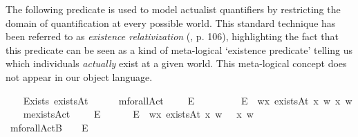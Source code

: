 \begin{isabellebody}
\isamarkuptrue%
%
\begin{isamarkuptext}%
The following predicate is used to model actualist quantifiers by restricting the domain of quantification at every possible world.
This standard technique has been referred to as \emph{existence relativization} (\cite{fitting98}, p. 106),
highlighting the fact that this predicate can be seen as a kind of meta-logical `existence predicate' telling us
which individuals \emph{actually} exist at a given world. This meta-logical concept does not appear in our object language.%
\end{isamarkuptext}\isamarkuptrue%
\ \ \isamarkupfalse%
\ Exists{\isacharcolon}{\isacharcolon}{\isachardoublequoteopen}{\isasymup}{\isasymlangle}{\isasymzero}{\isasymrangle}{\isachardoublequoteclose}\ {\isacharparenleft}{\isachardoublequoteopen}existsAt{\isachardoublequoteclose}{\isacharparenright}\ \ \isanewline
\isanewline
\ \ \isamarkupfalse%
\ mforallAct\ \ \ {\isacharcolon}{\isacharcolon}\ {\isachardoublequoteopen}{\isasymup}{\isasymlangle}{\isasymup}{\isasymlangle}{\isasymzero}{\isasymrangle}{\isasymrangle}{\isachardoublequoteclose}\ {\isacharparenleft}{\isachardoublequoteopen}\isactrlbold {\isasymforall}\isactrlsup E{\isachardoublequoteclose}{\isacharparenright}\ \ \ \ \isanewline
\ \ \ \ \ {\isachardoublequoteopen}\isactrlbold {\isasymforall}\isactrlsup E{\isasymPhi}\ {\isasymequiv}\ {\isasymlambda}w{\isachardot}{\isasymforall}x{\isachardot}\ {\isacharparenleft}existsAt\ x\ w{\isacharparenright}{\isasymlongrightarrow}{\isacharparenleft}{\isasymPhi}\ x\ w{\isacharparenright}{\isachardoublequoteclose}\isanewline
\ \ \isamarkupfalse%
\ mexistsAct\ \ \ {\isacharcolon}{\isacharcolon}\ {\isachardoublequoteopen}{\isasymup}{\isasymlangle}{\isasymup}{\isasymlangle}{\isasymzero}{\isasymrangle}{\isasymrangle}{\isachardoublequoteclose}\ {\isacharparenleft}{\isachardoublequoteopen}\isactrlbold {\isasymexists}\isactrlsup E{\isachardoublequoteclose}{\isacharparenright}\ \isanewline
\ \ \ \ \ {\isachardoublequoteopen}\isactrlbold {\isasymexists}\isactrlsup E{\isasymPhi}\ {\isasymequiv}\ {\isasymlambda}w{\isachardot}{\isasymexists}x{\isachardot}\ {\isacharparenleft}existsAt\ x\ w{\isacharparenright}\ {\isasymand}\ {\isacharparenleft}{\isasymPhi}\ x\ w{\isacharparenright}{\isachardoublequoteclose}\isanewline
\isanewline
\ \ \isamarkupfalse%
\ mforallActB\ \ {\isacharcolon}{\isacharcolon}\ {\isachardoublequoteopen}{\isasymup}{\isasymlangle}{\isasymup}{\isasymlangle}{\isasymzero}{\isasymrangle}{\isasymrangle}{\isachardoublequoteclose}\ {\isacharparenleft}\isactrlbold {\isasymforall}\isactrlsup E{\isachardoublequoteclose}{\isacharbrackleft}{}{\isacharbrackright}{}{\isacharparenright}\ %

\end{isabellebody}
